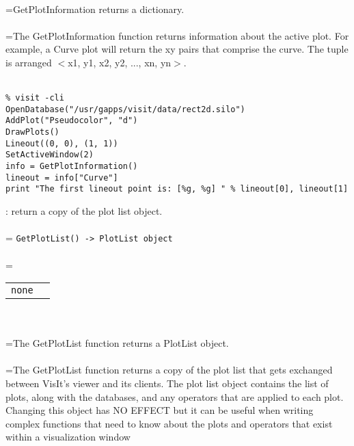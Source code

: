 \documentclass[10pt,a4paper]{report}
\begin{document}
 \\ 
\hangindent=\parindent GetPlotInformation returns a dictionary. \\[-3mm] 

 \\ 
\hangindent=\parindent The GetPlotInformation function returns information about the active plot. For example, a Curve plot will return the xy pairs that comprise the  curve.  The tuple is arranged $<$x1, y1, x2, y2, ..., xn, yn$>$. \\[-3mm] 

\\[-6mm]
\begin{verbatim}% visit -cli
OpenDatabase("/usr/gapps/visit/data/rect2d.silo")
AddPlot("Pseudocolor", "d")
DrawPlots()
Lineout((0, 0), (1, 1))
SetActiveWindow(2)
info = GetPlotInformation()
lineout = info["Curve"]
print "The first lineout point is: [%g, %g] " % lineout[0], lineout[1]
\end{verbatim}
\newpage


{}
: return a copy of the plot list object.\\[-3mm]

 \\ 
\hangindent=\parindent 
\verb!GetPlotList() -> PlotList object!\\ [-3mm]

 \\ 
\hangindent=\parindent 
\begin{tabular}{ll}
\verb!none! &  \\
\end{tabular} \\[-2mm]


 \\ 
\hangindent=\parindent The GetPlotList function returns a PlotList object. \\[-3mm] 

 \\ 
\hangindent=\parindent The GetPlotList function returns a copy of the plot list that gets exchanged between VisIt's viewer and its clients. The plot list object contains the list of plots, along with the databases, and any operators that are applied to each plot. Changing this object has NO EFFECT but it can be useful when writing complex functions that need to know about the plots and operators that exist within a visualization window \\[-3mm] 
\end{document}
